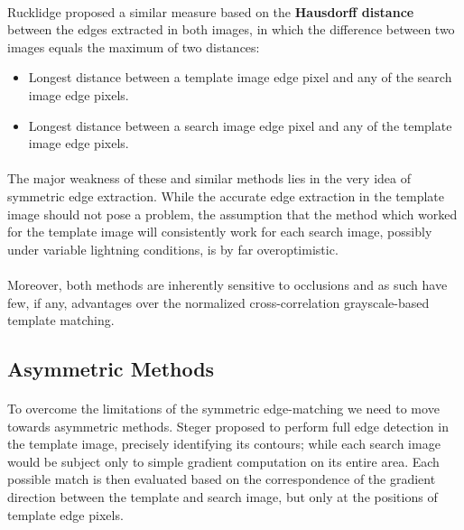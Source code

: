 \paragraph*{}
Rucklidge proposed\cite{Rucklidge95} a similar measure based on the \textbf{Hausdorff distance} between the edges extracted in both images, in which the difference between two images equals the maximum of two distances:
\begin{itemize}
	\item Longest distance between a template image edge pixel and any of the search image edge pixels.
	\item Longest distance between a search image edge pixel and any of the template image edge pixels.
\end{itemize}

\paragraph*{}
The major weakness of these and similar methods lies in the very idea of symmetric edge extraction. While the accurate edge extraction in the template image should not pose a problem, the assumption that the method which worked for the template image will consistently work for each search image, possibly under variable lightning conditions, is by far overoptimistic.

\paragraph*{}
Moreover, both methods are inherently sensitive to occlusions and as such have few, if any, advantages over the normalized cross-correlation grayscale-based template matching.

\subsection{Asymmetric Methods}

\paragraph*{}
To overcome the limitations of the symmetric edge-matching we need to move towards asymmetric methods. Steger proposed\cite{Steger02} to perform full edge detection in the template image, precisely identifying its contours; while each search image would be subject only to simple gradient computation on its entire area. Each possible match is then evaluated based on the correspondence of the gradient direction between the template and search image, but only at the positions of template edge pixels.

